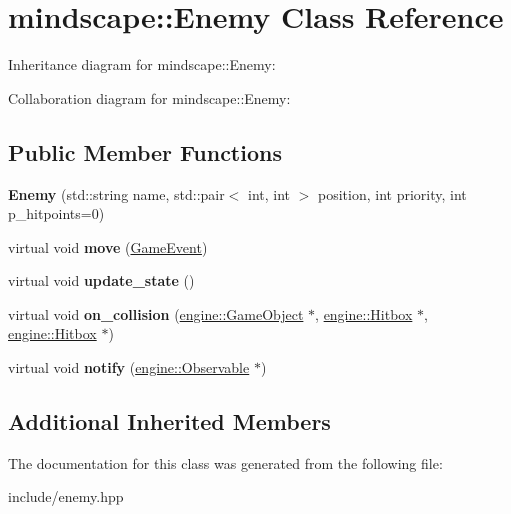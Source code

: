 \hypertarget{classmindscape_1_1_enemy}{}\section{mindscape\+:\+:Enemy Class Reference}
\label{classmindscape_1_1_enemy}


Inheritance diagram for mindscape\+:\+:Enemy\+:


Collaboration diagram for mindscape\+:\+:Enemy\+:
\subsection*{Public Member Functions}
\begin{DoxyCompactItemize}
\item 
{\bfseries Enemy} (std\+::string name, std\+::pair$<$ int, int $>$ position, int priority, int p\+\_\+hitpoints=0)\hypertarget{classmindscape_1_1_enemy_a5264b10dcb340844c3ac170553764de6}{}\label{classmindscape_1_1_enemy_a5264b10dcb340844c3ac170553764de6}

\item 
virtual void {\bfseries move} (\hyperlink{class_game_event}{Game\+Event})\hypertarget{classmindscape_1_1_enemy_aa2843767304d994345cb9a4415b4b489}{}\label{classmindscape_1_1_enemy_aa2843767304d994345cb9a4415b4b489}

\item 
virtual void {\bfseries update\+\_\+state} ()\hypertarget{classmindscape_1_1_enemy_a97aa2c11a763b2cbd13736469f8b7519}{}\label{classmindscape_1_1_enemy_a97aa2c11a763b2cbd13736469f8b7519}

\item 
virtual void {\bfseries on\+\_\+collision} (\hyperlink{classengine_1_1_game_object}{engine\+::\+Game\+Object} $\ast$, \hyperlink{classengine_1_1_hitbox}{engine\+::\+Hitbox} $\ast$, \hyperlink{classengine_1_1_hitbox}{engine\+::\+Hitbox} $\ast$)\hypertarget{classmindscape_1_1_enemy_a4c188f54ae13237a434774d9ad24b49e}{}\label{classmindscape_1_1_enemy_a4c188f54ae13237a434774d9ad24b49e}

\item 
virtual void {\bfseries notify} (\hyperlink{classengine_1_1_observable}{engine\+::\+Observable} $\ast$)\hypertarget{classmindscape_1_1_enemy_a790998a9c734d808f8a4834b303b8a67}{}\label{classmindscape_1_1_enemy_a790998a9c734d808f8a4834b303b8a67}

\end{DoxyCompactItemize}
\subsection*{Additional Inherited Members}


The documentation for this class was generated from the following file\+:\begin{DoxyCompactItemize}
\item 
include/enemy.\+hpp\end{DoxyCompactItemize}
